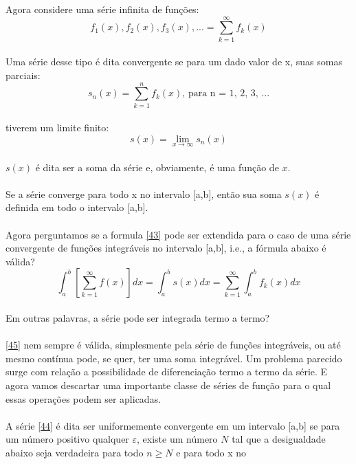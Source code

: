 Agora considere uma série infinita de funções:\\
\begin{equation}
\label{44}
    f_1(x), f_2(x), f_3(x), ... = \sum\limits_{k=1}^{\infty}f_k(x)
\end{equation}
\\
Uma série desse tipo é dita convergente se para um dado valor de x,
suas somas parciais:\\
\begin{equation}
    s_n(x) = \sum\limits_{k=1}^{n}f_k(x)\text{, para n = 1, 2, 3, ...}
\end{equation}
\\
tiverem um limite finito:\\
\begin{equation}
    s(x) = \lim_{x\to\infty} s_n(x)
\end{equation}
\\
$s(x)$ é dita ser a soma da série e, obviamente, é uma função de $x$.\\
\\
Se a série converge para todo x no intervalo [a,b], então sua soma $s(x)$
é definida em todo o intervalo [a,b].\\
\\
Agora perguntamos se a formula \ref{43} pode ser extendida para o caso de 
uma série convergente de funções integráveis no intervalo [a,b], i.e.,
a fórmula abaixo é válida?\\
\begin{equation}
\label{45}
    \int_{a}^{b}[\sum\limits_{k=1}^{\infty}f(x)]dx = \int_{a}^{b}s(x) dx = \sum\limits_{k=1}^{\infty}\int_{a}^{b}f_k(x) dx
\end{equation}
\\
Em outras palavras, a série pode ser integrada termo a termo?\\
\\
\ref{45} nem sempre é válida, simplesmente pela série de funções integráveis,
ou até mesmo contínua pode, se quer, ter uma soma integrável. Um problema parecido 
surge com relação a possibilidade de diferenciação termo a termo da série.
E agora vamos descartar uma importante classe de séries de função para o qual 
essas operações podem ser aplicadas.\\
\\
A série \ref{44} é dita ser uniformemente convergente em um intervalo [a,b] se
para um número positivo qualquer $\varepsilon$, existe um número $N$ tal que a
desigualdade abaixo seja verdadeira para todo $n \geq N$ e para todo x no 
